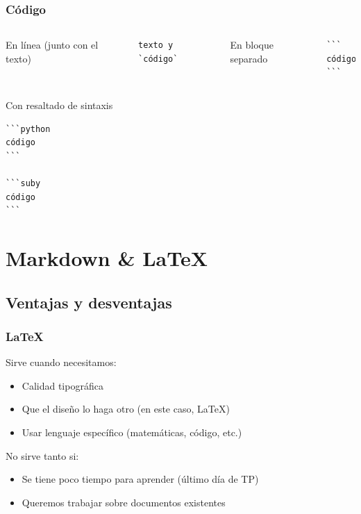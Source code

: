 \documentclass[svgnames]{beamer}
\begin{document}
\begin{frame}[fragile]
  \frametitle{Código}
  \begin{columns}
    En línea (junto con el texto)
    \begin{lstlisting}[style=md]
texto y `código`
    \end{lstlisting}\pause
    En bloque separado
    \begin{lstlisting}[style=md]
```
código
```
    \end{lstlisting}\pause
  \end{columns}\pause
  \vfill
  Con resaltado de sintaxis
  \begin{lstlisting}[style=md]
```python
código
```

```suby
código
```
  \end{lstlisting}
\end{frame}

\section{Markdown \& \LaTeX}
\subsection{Ventajas y desventajas}
\begin{frame}
  \frametitle{\LaTeX}
  Sirve cuando necesitamos:
  \begin{itemize}
    \item Calidad tipográfica
    \item Que el diseño lo haga otro (en este caso, \LaTeX)
    \item Usar lenguaje específico (matemáticas, código, etc.)
  \end{itemize}\pause

  \vfill

  No sirve tanto si:
  \begin{itemize}
    \item Se tiene poco tiempo para aprender (último día de TP)
    \item Queremos trabajar sobre documentos existentes
  \end{itemize}
\end{frame}
\end{document}
